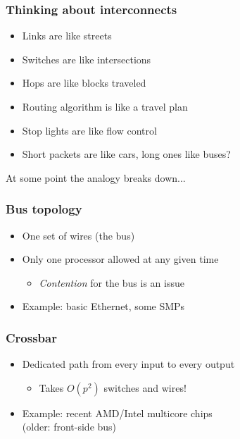 \documentclass{beamer}
\begin{document}
\begin{frame}
  \frametitle{Thinking about interconnects}

  \begin{itemize}
  \item Links are like streets
  \item Switches are like intersections
  \item Hops are like blocks traveled
  \item Routing algorithm is like a travel plan
  \item Stop lights are like flow control
  \item Short packets are like cars,
    long ones like buses?
  \end{itemize}
  At some point the analogy breaks down...

\end{frame}


\begin{frame}
  \frametitle{Bus topology}

  \begin{center}
    
  \end{center}

  \begin{itemize}
  \item One set of wires (the bus)
  \item Only one processor allowed at any given time
    \begin{itemize}
    \item {\em Contention} for the bus is an issue
    \end{itemize}
  \item Example: basic Ethernet, some SMPs
  \end{itemize}

\end{frame}


\begin{frame}
  \frametitle{Crossbar}

  \begin{center}
    
  \end{center}

  \begin{itemize}
  \item Dedicated path from every input to every output
    \begin{itemize}
    \item Takes $O(p^2)$ switches and wires!
    \end{itemize}
  \item Example: recent AMD/Intel multicore chips \\
    (older: front-side bus)
  \end{itemize}

\end{frame}
\end{document}
